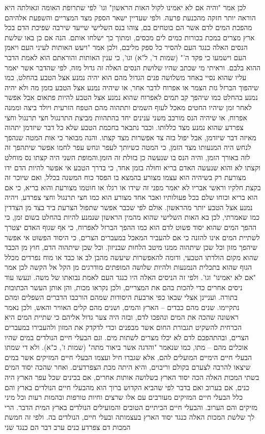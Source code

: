 \documentclass[12pt, openany]{book}
\begin{document}
לכן אמר "והיה אם לא יאמינו לקול האות הראשון" וגו' לפי שתרופת האומה וגאולתה היא הוראה יותר חזקה מהכנעת פרעה. ולפי שעדיין ישאר הספק מצד המצריים והשפעת אלהיהם מהפכת המים לדם אשר הם בוטחים בם, צוהו בנס השלישי שייעד שירבה שפיכת הדם בכל ארץ מצרים במכת בכורות כמים לים מכסים, ומתוך כך ישלחו אותם. הנה אם כן באו שלשת הנסים האלה כנגד העם להסיר כל ספק מליבם, ולכן אמר "ויעש האותות לעיני העם ויאמן העם וישמעו כי פקד ה'" (שמות ד', ל"א) וגו', כי ענין האותות והוראתם הוא לאמת הדבר ההוא בלבם. וראיתי מי שכתב שהיו שלושת הנסים האלה זה גדול מזה, לפי שהדבר אשר יאמר עליו שהוא נסיי באחד משלושה פנים הגדול מהם הוא יהיה נמנע אצל הטבע בהחלט, כמו שיהפוך הברזל גזת הצמר או אפרוח לדבר אחר, או שיהיה נמנע אצל הטבע בזמן מה ולא יהיה נמנע בהחלט כמו שיהפך קב תמים לאפרוח שהוא נמנע אצל הטבע להיות פתאום אבל אפשר לאחר זמן שיהיו החטים מאכל לעוף השמים ותתהוה מהם הטפח הזרעית ויולד ביצה וממנה אפרוח, או שיהיה הנס מורכב משני ענינים יחד בהתהוות מביצת התרנגול חצי תרנגול וחצי צפרדע שהוא נמנע מצד כללותו. וכבר נתבאר בחכמת הטבע שלא כל דבר שיזדמן יתהוה מאיזה דבר שיזדמן, אבל יפול בזה צד אפשרות מצד קצתו. והנה מבואר כי אות המטה שנהפך לנחש היה המנעותו מצד הזמן, כי המטה כשיותך לעפר ונחש עפר לחמו אפשר שיתהפך זה לזה באורך הזמן, והיה הנס בו שנעשה כן בזולת זה הזמן.והמופת השני היה קצתו נס מוחלט וקצתו לא והוא שנעשה האדם בריא וחולה בזמן אחד, כי בדרך הטבע אי אפשר להיות הדם ידו מצורעת רק בשיהיה הוא עצמו מצורע בהמצא בו הפסד כוח המשנה בכלל, ואם שיוכר זה בקצת חלקיו וראשי אבריו לא יאמר מפני זה שידו או רגלו או חוטמו מצורעת והוא בריא, כי אם הוא בריא וכוחו שלם בכל פעולותיו ואבר אחד מצורע הוא כמו חצי תרנגול וחצי צפרדע, ויהיה נמנע אצל הטבע יותר מהראשון. אולם לפי שכבר אפשר שתפול הצרעת ביד בצד מן הצדדין כמו שאמרתי, לכן בא האות השלישי שהוא מהמין הראשון שנמנע להיות בהחלט בשום זמן, כי ההפך המים שהוא יסוד פשוט לדם הוא כמו ההפך הברזל לאפרוח, כי אף שגוף האדם יצטרך לשתיית המים אינו להזנה כי אם להעביר המאכל במעברים הצרים, כי היסוד הפשוט אי אפשר שיהפך מזון וכל שכן שיתהוה ממנו מיטב הלחות שבניזון. וכל שכן שיתהוה הדם, חוץ מן הכבד שהוא מקום הולדתו הטבעי, ודומה להאפשרות שיעשה מהבן לב או כבד או מוח נפרדים מכלל הגוף שהוא בתכלית הנמנעות ולהיות שלושה המופתים מודרגים מן הקל אל הקשה לכן אמר "אם לא יאמינו" וגו'. ולפי זה הניסים האלה היו כנגד העם לאמת נבואתו של משה. ונעשו עוד ניסים אחרים כדי להכות בהם את המצריים, ולכן נקראו מכות, והן אותן העשר הכתובות בתורה. ועניינן אצלי שבאו כפי ארבעת היסודות שמהם הורכבו הדברים השפלים ומהם נתקיימו. שנים מהם כבדים – הארץ והמים, ושנים מהם קלים האוויר והאש, ולכן נאמר ראשונה שהכה את המים ונהפכו לדם, ובזה היה צער גדול אליהם כי שתיית המים היא הכרחית להשקיט תגבורת החום אשר מבפנים וכדי לדקדק את המזון ולהעבירו במעברים הצרים, ובהתהפכם לדם לא יכלו מצרים לשתות מים. וגם הבעלי חיים הנולדים במים שהיו אוכלים מהם – מתו, כמו שנאמר "והדגה אשר ביאור מתה" (שמות ז', כ"א). ולא די שמתו הבעלי חיים הימיים המועלים להם, אלא שגברו חיל ועצמו הבעלי חיים המזיקים אשר במים שיצאו להרבה לצערם בקולם וריבוים, והיא היתה מכת הצפרדעים. ואחר שהכה יסוד המים בשתי המכות האלה הכה יסוד הארץ בשלושה אותות אחרים, אם בכינים שכל עפר הארץ היה כנים, אם בערוב ואם בדבר לפי שהביא הקדוש ברוך הוא מהבעלי חיים הנולדים בארץ והם כלל הבעלי חיים המזיקים מעורבים עם אלו שרצים וחיות טורפות ובהמות רעות וכל מיני מזיקים והם הערוב. והבעלי חיים הביתיים הטובים והמועילים הנולדים בארץ המית הדבר. הרי לך שלשת המכות האלה כנגד יסוד הארץ בעצמותה ובעלי חיים, הנולדים בה. ולפי זה חמשת המכות דם צפרדע כנים ערב דבר הם כנגד שני 
\end{document}
